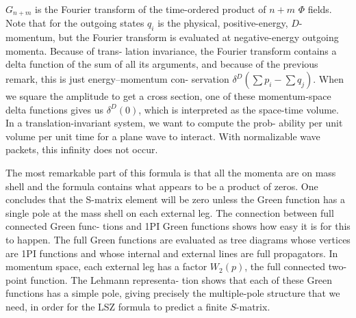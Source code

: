 $G_{n+m}$ is the Fourier transform of the time-ordered product of $n+m$ $\Phi$ fields. Note
that for the outgoing states $q_i$ is the physical, positive-energy, $D$-momentum, but the
Fourier transform is evaluated at negative-energy outgoing momenta. Because of trans-
lation invariance, the Fourier transform contains a delta function of the sum of all its
arguments, and because of the previous remark, this is just energy--momentum con-
servation $\delta^D(\sum p_i-\sum q_j)$. When we square the amplitude to get a cross section, one
of these momentum-space delta functions gives us $\delta^D(0)$, which is interpreted as the
space-time volume. In a translation-invariant system, we want to compute the prob-
ability per unit volume per unit time for a plane wave to interact. With normalizable
wave packets, this infinity does not occur.

The most remarkable part of this formula is that all the momenta are on mass shell
and the formula contains what appears to be a product of zeros. One concludes that
the S-matrix element will be zero unless the Green function has a single pole at the
mass shell on each external leg. The connection between full connected Green func-
tions and 1PI Green functions shows how easy it is for this to happen. The full Green
functions are evaluated as tree diagrams whose vertices are 1PI functions and whose
internal and external lines are full propagators. In momentum space, each external leg
has a factor $W_2(p)$, the full connected two-point function. The Lehmann representa-
tion shows that each of these Green functions has a simple pole, giving precisely the
multiple-pole structure that we need, in order for the LSZ formula to predict a finite
$S$-matrix.
